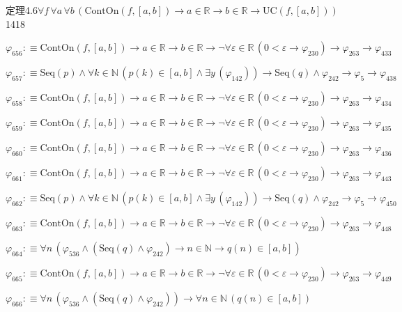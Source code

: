 \begin{fullproof}{定理4.6}{$\forall f\,\forall a\,\forall b\,(\mathrm{ContOn}(f,[a,b]) \to a \in \mathbb{R} \to b \in \mathbb{R} \to \mathrm{UC}(f,[a,b]))$}{1418}
\begin{abbrevlist}
\item $\varphi_{656} :\equiv \mathrm{ContOn}(f,[a,b]) \to a \in \mathbb{R} \to b \in \mathbb{R} \to \neg \forall \varepsilon \in \mathbb{R}\,(0 < \varepsilon \to \varphi_{230}) \to \varphi_{263} \to \varphi_{433}$
\item $\varphi_{657} :\equiv \mathrm{Seq}(p) \land \forall k \in \mathbb{N}\,(p(k) \in [a,b] \land \exists y\,(\varphi_{142})) \to \mathrm{Seq}(q) \land \varphi_{242} \to \varphi_{5} \to \varphi_{438}$
\item $\varphi_{658} :\equiv \mathrm{ContOn}(f,[a,b]) \to a \in \mathbb{R} \to b \in \mathbb{R} \to \neg \forall \varepsilon \in \mathbb{R}\,(0 < \varepsilon \to \varphi_{230}) \to \varphi_{263} \to \varphi_{434}$
\item $\varphi_{659} :\equiv \mathrm{ContOn}(f,[a,b]) \to a \in \mathbb{R} \to b \in \mathbb{R} \to \neg \forall \varepsilon \in \mathbb{R}\,(0 < \varepsilon \to \varphi_{230}) \to \varphi_{263} \to \varphi_{435}$
\item $\varphi_{660} :\equiv \mathrm{ContOn}(f,[a,b]) \to a \in \mathbb{R} \to b \in \mathbb{R} \to \neg \forall \varepsilon \in \mathbb{R}\,(0 < \varepsilon \to \varphi_{230}) \to \varphi_{263} \to \varphi_{436}$
\item $\varphi_{661} :\equiv \mathrm{ContOn}(f,[a,b]) \to a \in \mathbb{R} \to b \in \mathbb{R} \to \neg \forall \varepsilon \in \mathbb{R}\,(0 < \varepsilon \to \varphi_{230}) \to \varphi_{263} \to \varphi_{443}$
\item $\varphi_{662} :\equiv \mathrm{Seq}(p) \land \forall k \in \mathbb{N}\,(p(k) \in [a,b] \land \exists y\,(\varphi_{142})) \to \mathrm{Seq}(q) \land \varphi_{242} \to \varphi_{5} \to \varphi_{450}$
\item $\varphi_{663} :\equiv \mathrm{ContOn}(f,[a,b]) \to a \in \mathbb{R} \to b \in \mathbb{R} \to \neg \forall \varepsilon \in \mathbb{R}\,(0 < \varepsilon \to \varphi_{230}) \to \varphi_{263} \to \varphi_{448}$
\item $\varphi_{664} :\equiv \forall n\,(\varphi_{536} \land (\mathrm{Seq}(q) \land \varphi_{242}) \to n \in \mathbb{N} \to q(n) \in [a,b])$
\item $\varphi_{665} :\equiv \mathrm{ContOn}(f,[a,b]) \to a \in \mathbb{R} \to b \in \mathbb{R} \to \neg \forall \varepsilon \in \mathbb{R}\,(0 < \varepsilon \to \varphi_{230}) \to \varphi_{263} \to \varphi_{449}$
\item $\varphi_{666} :\equiv \forall n\,(\varphi_{536} \land (\mathrm{Seq}(q) \land \varphi_{242})) \to \forall n \in \mathbb{N}\,(q(n) \in [a,b])$

\end{abbrevlist}
\end{fullproof}
